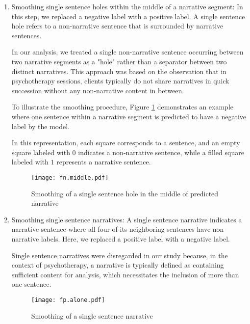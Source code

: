 \documentclass[preprint,12pt]{elsarticle}
\begin{document}
\begin{enumerate}

\item Smoothing single sentence holes within the middle of a narrative segment: In this step, we replaced a negative label with a positive label. A single sentence hole refers to a non-narrative sentence that is surrounded by narrative sentences.

In our analysis, we treated a single non-narrative sentence occurring between two narrative segments as a "hole" rather than a separator between two distinct narratives. This approach was based on the observation that in psychotherapy sessions, clients typically do not share narratives in quick succession without any non-narrative content in between.

To illustrate the smoothing procedure, Figure \ref{fig:fn.middle} demonstrates an example where one sentence within a narrative segment is predicted to have a negative label by the model. 

In this representation, each square corresponds to a sentence, and an empty square labeled with $0$ indicates a non-narrative sentence, while a filled square labeled with $1$ represents a narrative sentence.
    \begin{figure}[ht]
\centering
\texttt{[image: fn.middle.pdf]}
\caption{Smoothing of a single sentence hole in the middle of predicted narrative}
\label{fig:fn.middle}
\end{figure}

\item Smoothing single sentence narratives: A single sentence narrative indicates a narrative sentence where all four of its neighboring sentences have non-narrative labels.  Here, we replaced a positive label with a negative label.

Single sentence narratives were disregarded in our study because, in the context of psychotherapy, a narrative is typically defined as containing sufficient content for analysis, which necessitates the inclusion of more than one sentence.

\begin{figure}[ht]
\centering
\texttt{[image: fp.alone.pdf]}
\caption{Smoothing of a single sentence narrative}
\label{fig:fp.alone}
\end{figure}
\end{enumerate}
\end{document}
